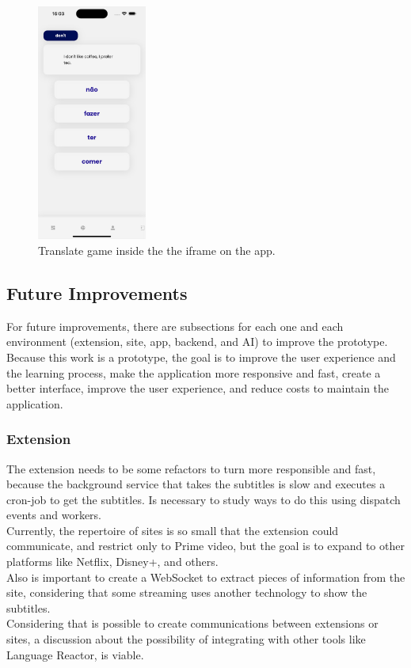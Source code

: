 \documentclass[12pt]{article}
\begin{document}
  \begin{figure}[!h]
    \centering
    \caption{
     Translate game inside the the iframe on the app.
    }
    \label{fig:app6}
    \includegraphics[width=0.32\textwidth]{assets/19.png}
  \end{figure}


\subsection{Future Improvements}

For future improvements, there are subsections for each one and each environment (extension, site, app, backend, and AI) to improve the prototype. Because this work is a prototype, the goal is to improve the user experience and the learning process,  make the application more responsive and fast, create a better interface, improve the user experience, and reduce costs to maintain the application.

\subsubsection{Extension}
The extension needs to be some refactors to turn more responsible and fast, because the background service that takes the subtitles is slow and executes a cron-job to get the subtitles. Is necessary to study ways to do this using dispatch events and workers. \\
Currently, the repertoire of sites is so small that the extension could communicate, and restrict only to Prime video, but the goal is to expand to other platforms like Netflix, Disney+, and others. \\
Also is important to create a WebSocket to extract pieces of information from the site, considering that some streaming uses another technology to show the subtitles. \\
Considering that is possible to create communications between extensions or sites, a discussion about the possibility of integrating with other tools like Language Reactor, is viable.
\end{document}
